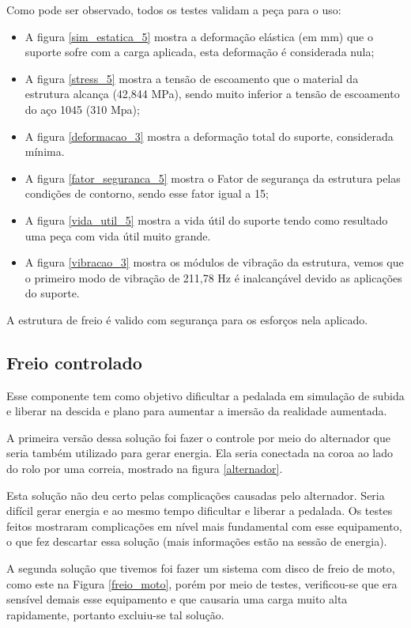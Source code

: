 Como pode ser observado, todos os testes validam a peça para o uso:
\begin{itemize}
    \item A figura \ref{sim_estatica_5} mostra a deformação elástica (em mm) que o suporte sofre com a carga aplicada, esta deformação é considerada nula;
    \item A figura \ref{stress_5} mostra a tensão de escoamento que o material da estrutura alcança (42,844 MPa), sendo muito inferior a tensão de escoamento do aço 1045 (310 Mpa);
    \item A figura \ref{deformacao_3} mostra a deformação total do suporte, considerada mínima.
    \item A figura \ref{fator_seguranca_5} mostra o Fator de segurança da estrutura pelas condições de contorno, sendo esse fator igual a 15;
    \item A figura \ref{vida_util_5} mostra a vida útil do suporte tendo como resultado uma peça com vida útil muito grande.
    \item A figura \ref{vibracao_3} mostra os módulos de vibração da estrutura, vemos que o primeiro modo de vibração de 211,78 Hz é inalcançável devido as aplicações do suporte.
\end{itemize}

A estrutura de freio é valido com segurança para os esforços nela aplicado.

\subsection{Freio controlado} \label{freio.controlado}
    Esse componente tem como objetivo dificultar a pedalada em simulação de subida e liberar na descida e plano para aumentar a imersão da realidade aumentada.

    A primeira versão dessa solução foi fazer o controle por meio do alternador que seria também utilizado para gerar energia. Ela seria conectada na coroa ao lado do rolo por uma correia, mostrado na figura \ref{alternador}.

    Esta solução não deu certo pelas complicações causadas pelo alternador. Seria difícil gerar energia e ao mesmo tempo dificultar e liberar a pedalada. Os testes feitos mostraram complicações em nível mais fundamental com esse equipamento, o que fez descartar essa solução (mais informações estão na sessão de energia).

    A segunda solução que tivemos foi fazer um sistema com disco de freio de moto, como este na Figura \ref{freio_moto}, porém por meio de testes, verificou-se que era sensível demais esse equipamento e que causaria uma carga muito alta rapidamente, portanto excluiu-se tal solução.

